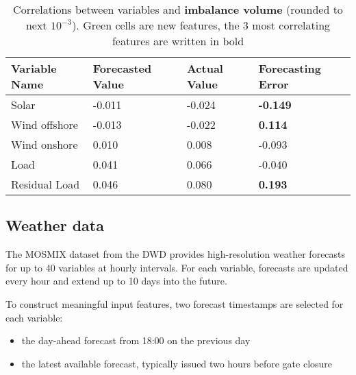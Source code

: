 \documentclass[class=scrbook, crop=false]{standalone}
\begin{document}



    \begin{table}
    \centering
    \begin{tabular}{l|l|l|l}
    Variable Name	&Forecasted Value& Actual Value	& Forecasting Error \\\hline
    Solar 		&  -0.011		& -0.024		& \cellcolor{green} \textbf{-0.149} \\
    Wind offshore 	& -0.013		&  -0.022		& \cellcolor{green}\textbf{0.114}\\
    Wind onshore 	& 0.010		& 0.008		& \cellcolor{green} -0.093\\
    Load 		& 0.041		& 0.066		& \cellcolor{green}  -0.040 \\
    Residual Load 	& \cellcolor{green} 0.046& \cellcolor{green} 0.080& \cellcolor{green} \textbf{0.193}\\
    \end{tabular}

    
    \caption{Correlations between variables and \textbf{imbalance volume} (rounded to next $10^{-3}$). Green cells are new features, the 3 most correlating features are written in bold}
    \label{Table::Imbalance_volume_Correlations_ENTSOE}
    \end{table}
    
    
    \subsection{Weather data}
    \label{Section::Weather_data}

The MOSMIX dataset from the \gls{DWD} provides high-resolution weather forecasts for up to 40 variables at hourly intervals. For each variable, forecasts are updated every hour and extend up to 10 days into the future.

To construct meaningful input features, two forecast timestamps are selected for each variable:
\begin{itemize}
\item the day-ahead forecast from 18:00 on the previous day 
\item the latest available forecast, typically issued two hours before gate closure
\end{itemize}
\end{document}
